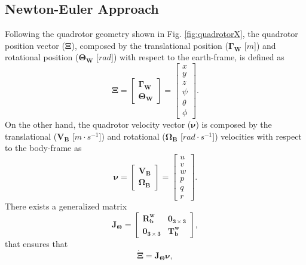 \subsection{Newton-Euler Approach}
Following the quadrotor geometry shown in Fig. \ref{fig:quadrotorX}, the quadrotor position vector ($\mathbf{\Xi}$), composed by the translational position ($\mathbf{\Gamma_W}$ [$m$]) and rotational position ($\mathbf{\Theta_W}$ [$rad$]) with respect to the earth-frame, is defined as
\begin{equation}
\mathbf{\Xi} = \begin{bmatrix}
\mathbf{\Gamma_W} \\ \mathbf{\Theta_W}
\end{bmatrix} = \begin{bmatrix}
x \\ y \\ z \\ \psi \\ \theta \\ \phi
\end{bmatrix}.
\end{equation}
On the other hand, the quadrotor velocity vector ($\mathbf{\nu}$) is composed by the translational ($\mathbf{V_B}$ [$m\cdot s^{-1}$]) and rotational ($\mathbf{\Omega_B}$ [$rad\cdot s^{-1}$]) velocities with respect to the body-frame as
\begin{equation}
\mathbf{\nu} = \begin{bmatrix}
\mathbf{V_B} \\ \mathbf{\Omega_B}
\end{bmatrix} =
\begin{bmatrix}
u \\ v \\ w \\ p \\ q \\ r
\end{bmatrix}.
\end{equation}
There exists a generalized matrix
\begin{equation}
\mathbf{J_\Theta} = \begin{bmatrix}
\mathbf{R_{b}^{w}} & \mathbf{0_{3\times 3}} \\
\mathbf{0_{3\times 3}} & \mathbf{T_{b}^{w}}
\end{bmatrix},
\end{equation}
that ensures that
\begin{equation}
\mathbf{\dot{\Xi}} = \mathbf{J_\Theta}\mathbf{\nu},
\end{equation}
